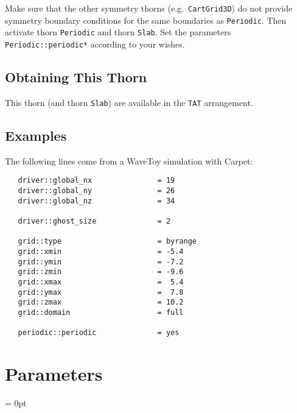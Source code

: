    Make sure that the other symmetry thorns (e.g.\
   \texttt{CartGrid3D}) do not provide symmetry boundary conditions
   for the same boundaries as \texttt{Periodic}.  Then activate thorn
   \texttt{Periodic} and thorn \texttt{Slab}.  Set the parameters
   \texttt{Periodic::periodic*} according to your wishes.

\subsection{Obtaining This Thorn}

   This thorn (and thorn \texttt{Slab}) are available in the
   \texttt{TAT} arrangement.

\subsection{Examples}

   The following lines come from a WaveToy simulation with Carpet:
\begin{verbatim}
   driver::global_nx               = 19
   driver::global_ny               = 26
   driver::global_nz               = 34

   driver::ghost_size              = 2

   grid::type                      = byrange
   grid::xmin                      = -5.4
   grid::ymin                      = -7.2
   grid::zmin                      = -9.6
   grid::xmax                      =  5.4
   grid::ymax                      =  7.8
   grid::zmax                      = 10.2
   grid::domain                    = full

   periodic::periodic              = yes
\end{verbatim}




\section{Parameters} 


\parskip = 0pt

\setlength{\tableWidth}{160mm}

\setlength{\paraWidth}{\tableWidth}
\setlength{\descWidth}{\tableWidth}
\settowidth{\maxVarWidth}{poison\_boundaries}

\addtolength{\paraWidth}{-\maxVarWidth}
\addtolength{\paraWidth}{-\columnsep}
\addtolength{\paraWidth}{-\columnsep}
\addtolength{\paraWidth}{-\columnsep}

